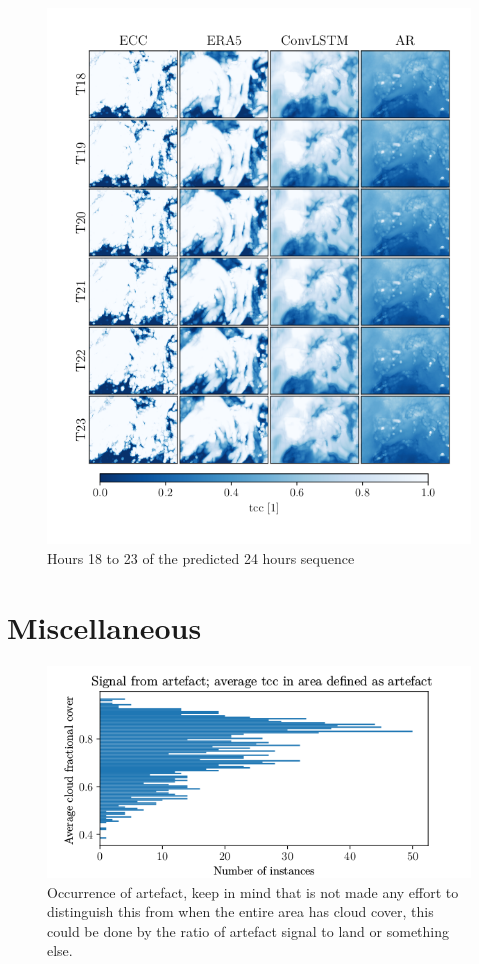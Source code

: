 \begin{figure}
    \centering
    \includegraphics{python_figs/comparing_seq_part_4_of4_jan2.png}
    \caption{Hours 18 to 23 of the  predicted 24 hours sequence }
    \label{fig:part4/4}
\end{figure}

\cleardoublepage

\chapter{Miscellaneous} \label{app:misc}

\begin{figure}
    \centering
    \includegraphics{python_figs/signal_artefact.png}
    \caption{Occurrence of artefact, keep in mind that is not made any effort to distinguish this from when the entire area has cloud cover, this could be done by the ratio of artefact signal to land or something else. }
    \label{fig:signal_artefact}
\end{figure}

